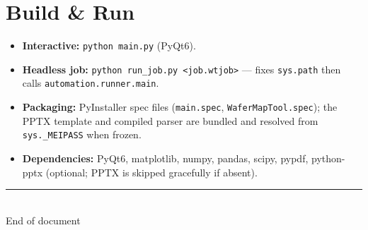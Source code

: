 \documentclass[11pt,a4paper]{report}
\newcommand{\code}[1]{\texttt{#1}}
\begin{document}
\chapter{Build \& Run}\label{ch:build}

\begin{itemize}[leftmargin=1.4em]
  \item \textbf{Interactive:} \code{python main.py} (PyQt6).
  \item \textbf{Headless job:} \code{python run\_job.py <job.wtjob>} — fixes
        \code{sys.path} then calls \code{automation.runner.main}.
  \item \textbf{Packaging:} PyInstaller spec files (\code{main.spec},
        \code{WaferMapTool.spec}); the PPTX template and compiled parser are
        bundled and resolved from \code{sys.\_MEIPASS} when frozen.
  \item \textbf{Dependencies:} PyQt6, matplotlib, numpy, pandas, scipy, pypdf,
        python-pptx (optional; PPTX is skipped gracefully if absent).
\end{itemize}

\vspace{1cm}
\begin{center}
\textcolor{muted}{\rule{0.5\textwidth}{0.4pt}}\\[4pt]
\textcolor{muted}{\small End of document}
\end{center}
\end{document}
